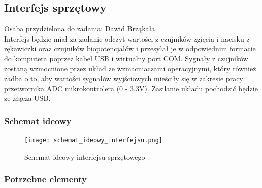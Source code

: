 \documentclass{article}
\begin{document}
\subsection{Interfejs sprzętowy}
Osaba przydzielona do zadania: Dawid Brząkała \\
Interfejs będzie miał za zadanie odczyt wartości z czujników zgięcia i nacisku z rękawiczki oraz czujników biopotencjałów i przesyłał je w odpowiednim formacie do komputera poprzez kabel USB i wirtualny port COM. Sygnały z czujników zostaną wzmocnione przez układ ze wzmacniaczami operacyjnymi, który również zadba o to, aby wartości sygnałów wyjściowych mieściły się w zakresie pracy przetwornika ADC mikrokontrolera (0 - 3.3V). Zasilanie układu pochodzić będzie ze złącza USB.
\subsubsection{Schemat ideowy}
\begin{figure}[h!]
\centering
\texttt{[image: schemat\_ideowy\_interfejsu.png]}
\label{fig:interfejs}
\caption {Schemat ideowy interfejsu sprzętowego}

\end{figure}


\subsubsection{Potrzebne elementy}
\end{document}
